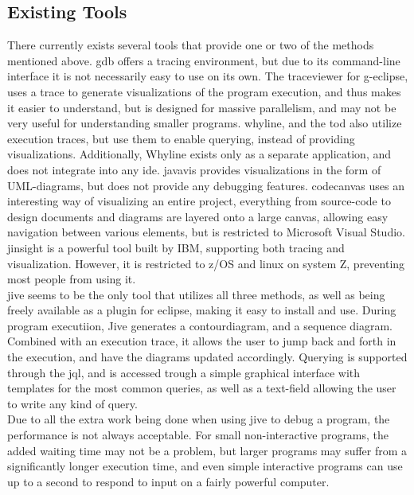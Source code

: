 \subsection{Existing Tools}\label{PreTools}
There currently exists several tools that provide one or two of the methods mentioned above.
\Gls{gdb} offers a tracing environment, but due to its command-line interface %
it is not necessarily easy to use on its own.
The \gls{traceviewer} for g-eclipse, uses a trace to generate visualizations of the program execution, and thus makes it easier to understand, but is  designed for massive parallelism, and may not be very useful for understanding smaller programs.
\Gls{whyline}\cite{ko2009}, and the \gls{tod}\cite{Pothier2007} also utilize execution traces, but use them to enable querying, instead of providing visualizations.
Additionally, Whyline exists only as a separate application, and does not integrate into any \gls{ide}.
\Gls{javavis} provides visualizations in the form of UML-diagrams, but does not provide any debugging features.
\Gls{codecanvas} uses an interesting way of visualizing an entire project,  everything from source-code to design documents and diagrams  are layered onto a large canvas, allowing easy navigation between various elements, but is restricted to Microsoft Visual Studio.
\Gls{jinsight} is a powerful tool  built by IBM, supporting both tracing and visualization.
However, it is restricted to z/OS and linux on system Z, preventing most people from using it.
~\\%

\Gls{jive} seems to be the only tool that utilizes all three methods, as well as being freely available as a plugin for eclipse, making it easy to install and use.
During program executiion, Jive generates a \gls{contourdiagram}\cite{Jayaraman1996}, and a sequence diagram.
Combined with an execution trace, it allows the user to jump back and forth in the  execution, and have the diagrams updated accordingly.
Querying is supported through the \gls{jql}, and is accessed trough a simple graphical interface with templates for the most common queries, as well as a text-field allowing the user to write any kind of query.
~\\
Due to all the extra work being done when using jive to debug a program, the performance is not always acceptable.
For small non-interactive programs, the added waiting time may not be a problem, but larger programs may suffer from a significantly longer execution time, and even simple interactive programs can use up to a second to respond to input on a fairly powerful computer.
~\\

